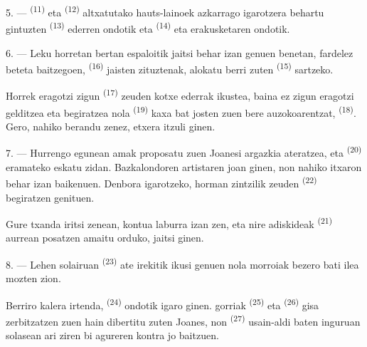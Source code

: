 5. ---  \textsuperscript{(11)} eta 
\textsuperscript{(12)} altxatutako hauts-lainoek azkarrago igarotzera behartu
gintuzten  \textsuperscript{(13)} 
ederren ondotik eta  \textsuperscript{(14)}
 eta  erakusketaren ondotik.

6. --- Leku horretan bertan espaloitik jaitsi behar izan genuen benetan, fardelez
beteta baitzegoen,  \textsuperscript{(16)} jaisten
zituztenak, alokatu berri zuten  \textsuperscript{(15)} sartzeko.

Horrek eragotzi zigun  \textsuperscript{(17)} zeuden
kotxe ederrak ikustea, baina ez zigun eragotzi gelditzea eta begiratzea nola
 \textsuperscript{(19)} kaxa bat josten zuen bere
auzokoarentzat, 
\textsuperscript{(18)}. Gero, nahiko berandu zenez, etxera itzuli ginen.

\VUsaut{3.0mm}

7. --- Hurrengo egunean amak proposatu zuen Joanesi argazkia ateratzea, eta
 \textsuperscript{(20)} eramateko eskatu zidan.
Bazkalondoren artistaren  joan ginen, non nahiko itxaron behar
izan baikenuen. Denbora igarotzeko, horman zintzilik zeuden 
\textsuperscript{(22)} begiratzen genituen.

Gure txanda iritsi zenean, kontua laburra izan zen, eta nire adiskideak
 \textsuperscript{(21)} aurrean posatzen amaitu orduko, jaitsi
ginen.

8. --- Lehen solairuan  \textsuperscript{(23)} ate
irekitik ikusi genuen nola morroiak bezero bati ilea mozten zion.

Berriro kalera irtenda,  \textsuperscript{(24)} ondotik
igaro ginen.  gorriak \textsuperscript{(25)} eta 
\textsuperscript{(26)} gisa zerbitzatzen zuen  hain
dibertitu zuten Joanes, non 
\textsuperscript{(27)} usain-aldi baten inguruan solasean ari ziren bi agureren
kontra jo baitzuen.

\VUsaut{3.0mm}

